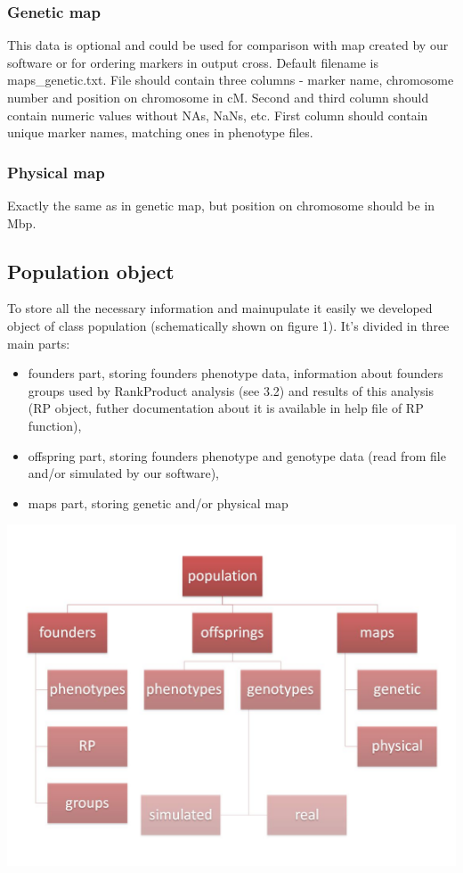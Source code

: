 \documentclass{article}
\begin{document}
\begin{multicols}{2}
\subsubsection{Genetic map}
This data is optional and could be used for comparison with map created by our software or for ordering markers in output cross. Default filename is maps\_genetic.txt. File should contain three columns - marker name, chromosome number and position on chromosome in cM. Second and third column should contain numeric values without NAs, NaNs, etc. First column should contain unique marker names, matching ones in phenotype files.
\subsubsection{Physical map}
Exactly the same as in genetic map, but position on chromosome should be in Mbp.
\end{multicols}
\begin{multicols}{2}
\subsection{Population object}
To store all the necessary information and mainupulate it easily we developed object of class population (schematically shown on figure 1). It's divided in three main parts:
\begin{itemize}
\item  founders part, storing founders phenotype data, information about founders groups used by RankProduct analysis (see 3.2) and results of this analysis (RP object, futher documentation about it is available in help file of RP function),
\item  offspring part, storing founders phenotype and genotype data (read from file and/or simulated by our software),
\item maps part, storing genetic and/or physical map
\end{itemize}
\includegraphics[scale=0.22]{population.jpg}
\end{multicols}
\newpage
\end{document}
